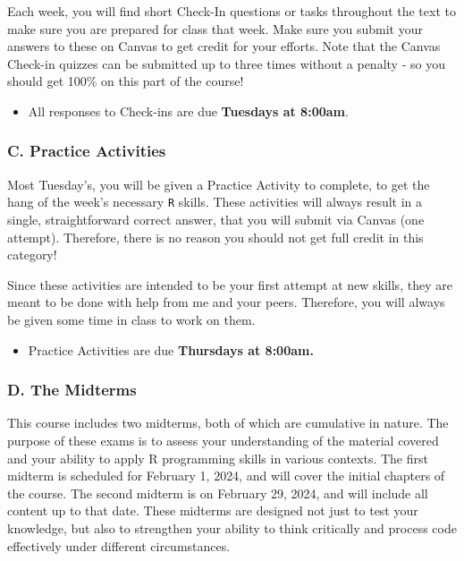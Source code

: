 \documentclass[
  11pt,
  letterpaper,
  DIV=11,
  numbers=noendperiod]{scrartcl}
\providecommand{\tightlist}{%
  \setlength{\itemsep}{0pt}\setlength{\parskip}{0pt}}\usepackage{longtable,booktabs,array}
\begin{document}
Each week, you will find short Check-In questions or tasks throughout
the text to make sure you are prepared for class that week. Make sure
you submit your answers to these on Canvas to get credit for your
efforts. Note that the Canvas Check-in quizzes can be submitted up to
three times without a penalty - so you should get 100\% on this part of
the course!

\begin{itemize}
\tightlist
\item
  All responses to Check-ins are due \textbf{Tuesdays at 8:00am}.
\end{itemize}

\hypertarget{c.-practice-activities}{%
\subsubsection{C. Practice Activities}\label{c.-practice-activities}}

Most Tuesday's, you will be given a Practice Activity to complete, to
get the hang of the week's necessary \texttt{R} skills. These activities
will always result in a single, straightforward correct answer, that you
will submit via Canvas (one attempt). Therefore, there is no reason you
should not get full credit in this category!

Since these activities are intended to be your first attempt at new
skills, they are meant to be done with help from me and your peers.
Therefore, you will always be given some time in class to work on them.

\begin{itemize}
\tightlist
\item
  Practice Activities are due \textbf{Thursdays at 8:00am.}
\end{itemize}

\hypertarget{d.-the-midterms}{%
\subsubsection{D. The Midterms}\label{d.-the-midterms}}

This course includes two midterms, both of which are cumulative in
nature. The purpose of these exams is to assess your understanding of
the material covered and your ability to apply R programming skills in
various contexts. The first midterm is scheduled for February 1, 2024,
and will cover the initial chapters of the course. The second midterm is
on February 29, 2024, and will include all content up to that date.
These midterms are designed not just to test your knowledge, but also to
strengthen your ability to think critically and process code effectively
under different circumstances.
\end{document}
